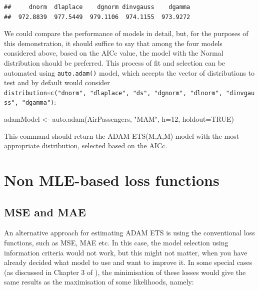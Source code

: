 \documentclass[
]{book}
\newenvironment{Shaded}{\begin{snugshade}}{\end{snugshade}}
\newcommand{\AttributeTok}[1]{\textcolor[rgb]{0.77,0.63,0.00}{#1}}
\newcommand{\ConstantTok}[1]{\textcolor[rgb]{0.00,0.00,0.00}{#1}}
\newcommand{\DecValTok}[1]{\textcolor[rgb]{0.00,0.00,0.81}{#1}}
\newcommand{\FunctionTok}[1]{\textcolor[rgb]{0.00,0.00,0.00}{#1}}
\newcommand{\NormalTok}[1]{#1}
\newcommand{\OtherTok}[1]{\textcolor[rgb]{0.56,0.35,0.01}{#1}}
\newcommand{\StringTok}[1]{\textcolor[rgb]{0.31,0.60,0.02}{#1}}
\theoremstyle{definition}
\theoremstyle{definition}
\theoremstyle{definition}
\theoremstyle{definition}
\theoremstyle{remark}
\begin{document}
\begin{verbatim}
##     dnorm  dlaplace    dgnorm dinvgauss    dgamma 
##  972.8839  977.5449  979.1106  974.1155  973.9272
\end{verbatim}

We could compare the performance of models in detail, but, for the purposes of this demonstration, it should suffice to say that among the four models considered above, based on the AICc value, the model with the Normal distribution should be preferred. This process of fit and selection can be automated using \texttt{auto.adam()} model, which accepts the vector of distributions to test and by default would consider \texttt{distribution=c("dnorm",\ "dlaplace",\ "ds",\ "dgnorm",\ "dlnorm",\ "dinvgauss",\ "dgamma")}:

\begin{Shaded}
\begin{Highlighting}[]
\NormalTok{adamModel }\OtherTok{\textless{}{-}} \FunctionTok{auto.adam}\NormalTok{(AirPassengers, }\StringTok{"MAM"}\NormalTok{, }\AttributeTok{h=}\DecValTok{12}\NormalTok{, }\AttributeTok{holdout=}\ConstantTok{TRUE}\NormalTok{)}
\end{Highlighting}
\end{Shaded}

This command should return the ADAM ETS(M,A,M) model with the most appropriate distribution, selected based on the AICc.

\hypertarget{non-mle-based-loss-functions}{%
\section{Non MLE-based loss functions}\label{non-mle-based-loss-functions}}

\hypertarget{MSEandMAEEstimators}{%
\subsection{MSE and MAE}\label{MSEandMAEEstimators}}

An alternative approach for estimating ADAM ETS is using the conventional loss functions, such as MSE, MAE etc. In this case, the model selection using information criteria would not work, but this might not matter, when you have already decided what model to use and want to improve it. In some special cases (as discussed in Chapter 3 of \citet{SvetunkovSBA}), the minimisation of these losses would give the same results as the maximisation of some likelihoods, namely:
\end{document}
